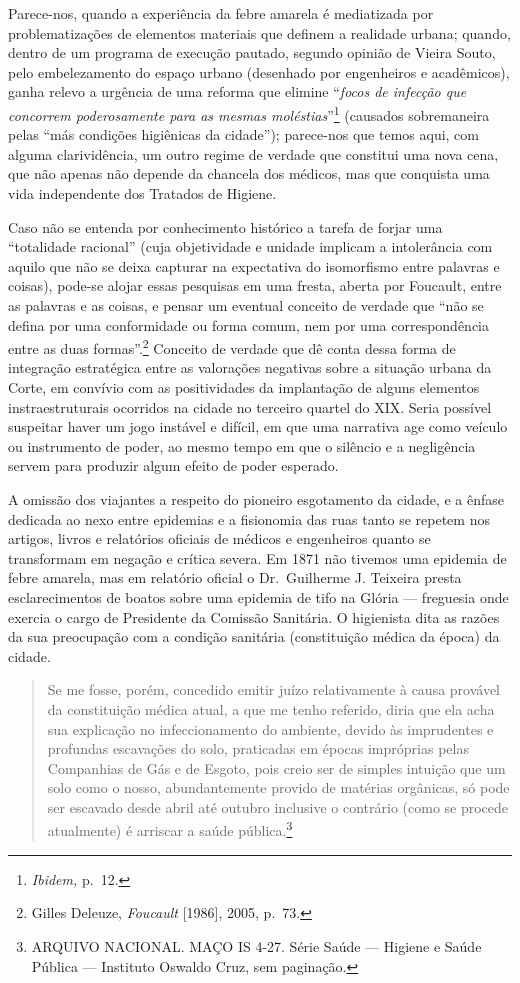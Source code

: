 Parece-nos, quando a experiência da febre amarela é mediatizada por
problematizações de elementos materiais que definem a realidade urbana;
quando, dentro de um programa de execução pautado, segundo opinião de
Vieira Souto, pelo embelezamento do espaço urbano (desenhado por
engenheiros e acadêmicos), ganha relevo a urgência de uma reforma que
elimine ``\textit{focos de infecção que concorrem poderosamente para as
mesmas moléstias}''\footnote{\textit{Ibidem,} p.~12.} (causados
sobremaneira pelas ``más condições higiênicas da cidade''); parece-nos
que temos aqui, com alguma clarividência, um outro regime de verdade que
constitui uma nova cena, que não apenas não depende da chancela dos
médicos, mas que conquista uma vida independente dos Tratados de
Higiene.

Caso não se entenda por conhecimento histórico a tarefa de forjar uma
``totalidade racional'' (cuja objetividade e unidade implicam a
intolerância com aquilo que não se deixa capturar na expectativa do
isomorfismo entre palavras e coisas), pode-se alojar essas pesquisas em
uma fresta, aberta por Foucault, entre as palavras e as coisas, e pensar
um eventual conceito de verdade que ``não se defina por uma conformidade
ou forma comum, nem por uma correspondência entre as duas
formas''.\footnote{Gilles Deleuze, \textit{Foucault} {[}1986{]}, 2005,
  p.~73.} Conceito de verdade que dê conta dessa forma de integração
estratégica entre as valorações negativas sobre a situação urbana da
Corte, em convívio com as positividades da implantação de alguns
elementos instraestruturais ocorridos na cidade no terceiro quartel do
XIX. Seria possível suspeitar haver um jogo instável e difícil, em que
uma narrativa age como veículo ou instrumento de poder, ao mesmo tempo
em que o silêncio e a negligência servem para produzir algum efeito de
poder esperado.

A omissão dos viajantes a respeito do pioneiro esgotamento da cidade, e
a ênfase dedicada ao nexo entre epidemias e a fisionomia das ruas tanto
se repetem nos artigos, livros e relatórios oficiais de médicos e
engenheiros quanto se transformam em negação e crítica severa. Em 1871
não tivemos uma epidemia de febre amarela, mas em relatório oficial o
Dr.~Guilherme J. Teixeira presta esclarecimentos de boatos sobre uma
epidemia de tifo na Glória --- freguesia onde exercia o cargo de
Presidente da Comissão Sanitária. O higienista dita as razões da sua
preocupação com a condição sanitária (constituição médica da época) da
cidade.

\begin{quote}
Se me fosse, porém, concedido emitir juízo relativamente à causa
provável da constituição médica atual, a que me tenho referido, diria
que ela acha sua explicação no infeccionamento do ambiente, devido às
imprudentes e profundas escavações do solo, praticadas em épocas
impróprias pelas Companhias de Gás e de Esgoto, pois creio ser de
simples intuição que um solo como o nosso, abundantemente provido de
matérias orgânicas, só pode ser escavado desde abril até outubro
inclusive o contrário (como se procede atualmente) é arriscar a saúde
pública.\footnote{ARQUIVO NACIONAL. MAÇO IS 4-27. Série Saúde --- Higiene
  e Saúde Pública --- Instituto Oswaldo Cruz, sem paginação.}
\end{quote}

